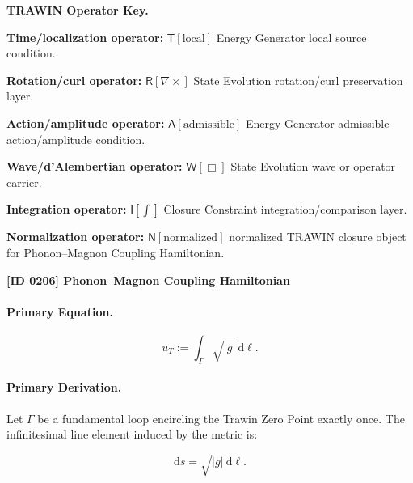 \par\vspace{0.45\baselineskip}
\noindent\begin{minipage}[t]{\linewidth}
\begingroup
\small
\raggedright
\textbf{TRAWIN Operator Key.}\par
\noindent\textbf{Time/localization operator:} $\mathsf{T}\!\left[\mathrm{local}\right]$ Energy Generator local source condition.\par
\noindent\textbf{Rotation/curl operator:} $\mathsf{R}\!\left[\nabla\times\right]$ State Evolution rotation/curl preservation layer.\par
\noindent\textbf{Action/amplitude operator:} $\mathsf{A}\!\left[\mathrm{admissible}\right]$ Energy Generator admissible action/amplitude condition.\par
\noindent\textbf{Wave/d'Alembertian operator:} $\mathsf{W}\!\left[\Box\right]$ State Evolution wave or operator carrier.\par
\noindent\textbf{Integration operator:} $\mathsf{I}\!\left[\int\right]$ Closure Constraint integration/comparison layer.\par
\noindent\textbf{Normalization operator:} $\mathsf{N}\!\left[\mathrm{normalized}\right]$ normalized TRAWIN closure object for Phonon--Magnon Coupling Hamiltonian.\par
\endgroup
\end{minipage}

\clearpage
\noindent\textbf{[ID 0206] Phonon--Magnon Coupling Hamiltonian}\par
\vspace{0.35em}
\paragraph{Primary Equation.}
\begin{equation}
u_T := \int_{\Gamma}\sqrt{|g|}\,\mathrm{d}\ell .
\end{equation}

\paragraph{Primary Derivation.}
Let $\Gamma$ be a fundamental loop encircling the Trawin Zero Point exactly once.  
The infinitesimal line element induced by the metric is:

\begin{equation}
\mathrm{d}s = \sqrt{|g|}\,\mathrm{d}\ell .
\end{equation}

